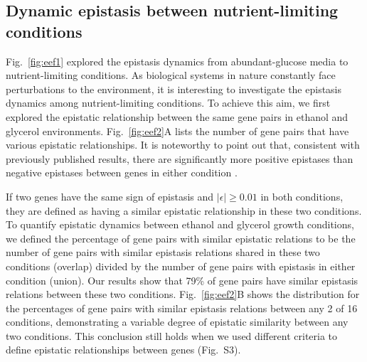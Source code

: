 \documentclass[10pt]{article}
\newcommand{\Fig}{Fig.}
\newcommand{\citep}{\cite}
\begin{document}
\subsection*{Dynamic epistasis between nutrient-limiting conditions}

\Fig~\ref{fig:eef1} explored the epistasis dynamics from abundant-glucose media
to nutrient-limiting conditions. As biological systems in nature
constantly face perturbations to the environment, it is
interesting to investigate the epistasis dynamics among
nutrient-limiting conditions. To achieve this aim, we first explored
the epistatic relationship between the same gene pairs in ethanol and
glycerol environments. \Fig~\ref{fig:eef2}A lists the number of gene pairs that have various
epistatic relationships. It is noteworthy to point out that,
consistent with previously published results, there are significantly
more positive epistases than negative epistases between genes in either
condition \citep{He2010}.


If two genes have the same sign of epistasis and
$\left|\epsilon\right| \geq 0.01$ in both conditions, they are defined
as having a similar epistatic
relationship in these two conditions. To quantify epistatic dynamics
between ethanol and glycerol growth conditions, we defined the
percentage of gene pairs with similar epistatic relations to be the
number of gene pairs with similar epistasis relations shared in these
two conditions (overlap) divided by the number of gene pairs with
epistasis in either condition (union). Our results show that 79\% of
gene pairs have similar epistasis relations between these two
conditions. \Fig~\ref{fig:eef2}B shows the distribution for the percentages of
gene pairs with similar epistasis relations between any 2 of 16
conditions, demonstrating a variable degree of epistatic similarity
between any two conditions.  This conclusion still holds when we used
different criteria to define epistatic relationships between genes
(\Fig~S3).
\end{document}
